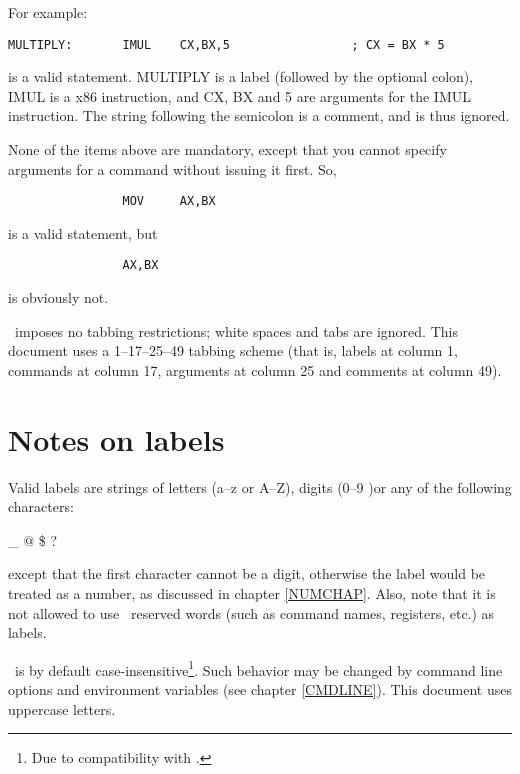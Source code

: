 \documentclass[a4paper,draft,12pt]{book}
\begin{document}
For example:

\begin{verbatim}
MULTIPLY:       IMUL    CX,BX,5                 ; CX = BX * 5
\end{verbatim}

\noindent is a valid statement. MULTIPLY is a label (followed by the
optional colon), IMUL is a x86 instruction, and CX, BX and 5 are
arguments for the IMUL instruction. The string following the semicolon
is a comment, and is thus ignored.

None of the items above are mandatory, except that you cannot specify
arguments for a command without issuing it first. So,

\begin{verbatim}
                MOV     AX,BX
\end{verbatim}

\noindent is a valid statement, but

\begin{verbatim}
                AX,BX
\end{verbatim}

\noindent is obviously not.

\popasm\ imposes no tabbing restrictions; white spaces and tabs are
ignored. This document uses a 1--17--25--49 tabbing scheme (that is,
labels at column 1, commands at column 17, arguments at column 25 and
comments at column 49).

\section{Notes on labels\label{NOTELABEL}}

Valid labels are strings of letters (a--z or A--Z), digits (0--9 )or any
of the following characters:

\begin{center}
\_ @ \$ ?
\end{center}

\noindent except that the first character cannot be a digit, otherwise the
label would be treated as a number, as discussed in chapter \ref{NUMCHAP}.
Also, note that it is not allowed to use \popasm\ reserved words (such as
command names, registers, etc.) as labels.

\popasm\ is by default case-insensitive\footnote{Due to compatibility with
\tasm.}. Such behavior may be changed by command line options and environment
variables (see chapter \ref{CMDLINE}). This document uses uppercase letters.
\end{document}
